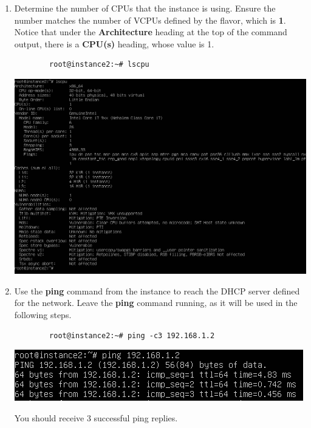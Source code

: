 \documentclass[letterpaper, 12pt]{article}
\begin{document}
\begin{enumerate}
    \item Determine the number of CPUs that the instance is using.
    Ensure the number matches the number of VCPUs defined by the flavor, which is \textbf{1}.
    Notice that under the \textbf{Architecture} heading at the top of the command output, there is a \textbf{CPU(s)} heading, whose value is 1.
    \begin{lstlisting}
        root@instance2:~# lscpu
    \end{lstlisting}

    \begin{center}
        \includegraphics[width=\linewidth]{images/part5/step9.png}
    \end{center}

    \item Use the \textbf{ping} command from the instance to reach the DHCP server defined for the network.
    Leave the \textbf{ping} command running, as it will be used in the following steps.
    \begin{lstlisting}
        root@instance2:~# ping -c3 192.168.1.2
    \end{lstlisting}

    \begin{center}
        \includegraphics[width=\linewidth]{images/part5/step10.png}
    \end{center}

    \begin{notebox}
        You should receive 3 successful ping replies.
    \end{notebox}


\end{enumerate}
\end{document}
